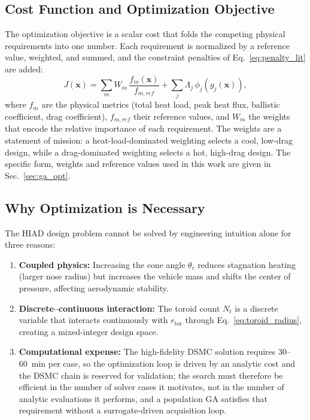 \subsection{Cost Function and Optimization Objective}

The optimization objective is a scalar cost that folds the competing physical requirements into one number. Each requirement is normalized by a reference value, weighted, and summed, and the constraint penalties of Eq.~\eqref{eq:penalty_lit} are added:
\begin{equation}
    J(\mathbf{x}) = \sum_{m} W_m \, \frac{f_m(\mathbf{x})}{f_{m,ref}} + \sum_{j} \Lambda_j \, \phi_j\!\left(g_j(\mathbf{x})\right),
    \label{eq:cost_function}
\end{equation}
\noindent where $f_m$ are the physical metrics (total heat load, peak heat flux, ballistic coefficient, drag coefficient), $f_{m,ref}$ their reference values, and $W_m$ the weights that encode the relative importance of each requirement. The weights are a statement of mission: a heat-load-dominated weighting selects a cool, low-drag design, while a drag-dominated weighting selects a hot, high-drag design. The specific form, weights and reference values used in this work are given in Sec.~\ref{sec:ga_opt}.

\subsection{Why Optimization is Necessary}

The HIAD design problem cannot be solved by engineering intuition alone for three reasons:

\begin{enumerate}
    \item \textbf{Coupled physics:} Increasing the cone angle $\theta_c$ reduces stagnation heating (larger nose radius) but increases the vehicle mass and shifts the center of pressure, affecting aerodynamic stability.
    \item \textbf{Discrete--continuous interaction:} The toroid count $N_t$ is a discrete variable that interacts continuously with $r_{\text{tor}}$ through Eq.~\ref{eq:toroid_radius}, creating a mixed-integer design space.
    \item \textbf{Computational expense:} The high-fidelity DSMC solution requires 30--60~min per case, so the optimization loop is driven by an analytic cost and the DSMC chain is reserved for validation; the search must therefore be efficient in the number of solver cases it motivates, not in the number of analytic evaluations it performs, and a population GA satisfies that requirement without a surrogate-driven acquisition loop.
\end{enumerate}

